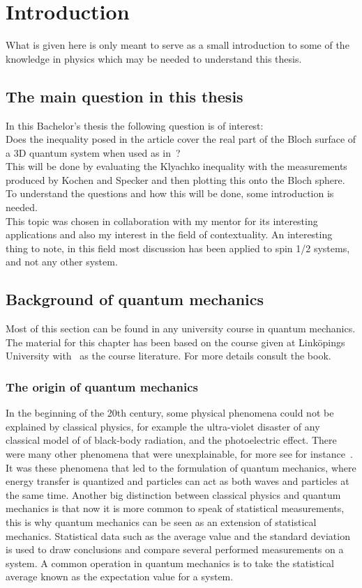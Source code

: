\chapter{Introduction}\label{cha:intro}
What is given here is only meant to serve as a small introduction to some of the knowledge in physics which may be needed to understand this thesis.    
\newpage
\section{The main question in this thesis}
In this Bachelor's thesis the following question is of interest:\\
Does the inequality posed in the article \cite{PhysRevLett.101.020403} cover the real
part of the Bloch surface of a 3D quantum system when used as in~\cite{Kochen1968The}?\\
This will be done by evaluating the Klyachko inequality with the measurements produced by Kochen and Specker and then plotting this onto the Bloch sphere.
To understand the questions and how this will be done, some introduction is needed.\\
This topic was chosen in collaboration with my mentor for its interesting applications and also my interest in the field of contextuality. An interesting thing to note, in this field most discussion has been applied to spin 1/2 systems, and not any other system.
\section{Background of quantum mechanics}\label{sec:intro:Background of quantum mechanics}
Most of this section can be found in any university course in quantum mechanics. The material for this chapter has been based on the course given at Linköpings University with~\cite{Bransden:2000}
as the course literature. For more details consult the book. 
\subsection{The origin of quantum mechanics}
In the beginning of the 20th century, some physical phenomena could not be explained by classical physics, for example the ultra-violet disaster of any classical model of of black-body radiation, and the photoelectric effect. There were many other phenomena that were unexplainable, for more see for instance~\cite{Bransden:2000}.
It was these phenomena that led to the formulation of quantum mechanics, where energy transfer is quantized and particles can act as both waves and particles at the same time. Another big distinction between classical physics and quantum mechanics is that now it is more common to speak of statistical measurements, this is why quantum mechanics can be seen as an extension of statistical mechanics.
Statistical data such as the average value and the standard deviation is used to draw conclusions and compare several performed measurements on a system. A common operation in quantum mechanics is to take the statistical average known as the expectation value for a system.    


